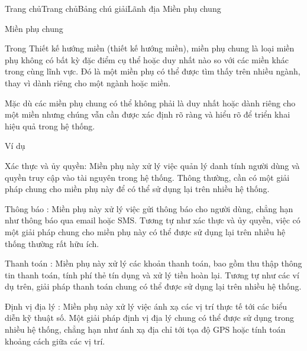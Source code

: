 




Trang chủTrang chủBảng chú giảiLãnh địa Miền phụ chung

Miền phụ chung

Trong Thiết kế hướng miền (thiết kế hướng miền), miền phụ chung là loại miền phụ không có bất kỳ đặc điểm cụ thể hoặc duy nhất nào so với các miền khác trong cùng lĩnh vực. Đó là một miền phụ có thể được tìm thấy trên nhiều ngành, thay vì dành riêng cho một ngành hoặc miền.

Mặc dù các miền phụ chung có thể không phải là duy nhất hoặc dành riêng cho một miền nhưng chúng vẫn cần được xác định rõ ràng và hiểu rõ để triển khai hiệu quả trong hệ thống.

Ví dụ

Xác thực và ủy quyền: Miền phụ này xử lý việc quản lý danh tính người dùng và quyền truy cập vào tài nguyên trong hệ thống. Thông thường, cần có một giải pháp chung cho miền phụ này để có thể sử dụng lại trên nhiều hệ thống.

Thông báo : Miền phụ này xử lý việc gửi thông báo cho người dùng, chẳng hạn như thông báo qua email hoặc SMS. Tương tự như xác thực và ủy quyền, việc có một giải pháp chung cho miền phụ này có thể được sử dụng lại trên nhiều hệ thống thường rất hữu ích.

Thanh toán : Miền phụ này xử lý các khoản thanh toán, bao gồm thu thập thông tin thanh toán, tính phí thẻ tín dụng và xử lý tiền hoàn lại. Tương tự như các ví dụ trên, giải pháp thanh toán chung có thể được sử dụng lại trên nhiều hệ thống.

Định vị địa lý : Miền phụ này xử lý việc ánh xạ các vị trí thực tế tới các biểu diễn kỹ thuật số. Một giải pháp định vị địa lý chung có thể được sử dụng trong nhiều hệ thống, chẳng hạn như ánh xạ địa chỉ tới tọa độ GPS hoặc tính toán khoảng cách giữa các vị trí.


